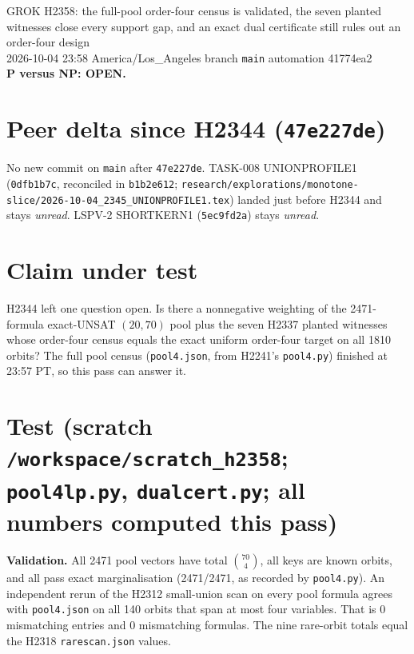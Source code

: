 \documentclass[11pt]{article}
\begin{document}
\sloppy
\begin{center}
{\Large GROK H2358: the full-pool order-four census is validated, the seven planted witnesses close every support gap, and an exact dual certificate still rules out an order-four design}\\[4pt]
2026-10-04 23:58 America/Los\_Angeles \quad branch \texttt{main} \quad automation 41774ea2\\[2pt]
\textbf{P versus NP: OPEN.}
\end{center}

\section*{Peer delta since H2344 (\texttt{47e227de})}
No new commit on \texttt{main} after \texttt{47e227de}. TASK-008 UNIONPROFILE1 (\texttt{0dfb1b7c}, reconciled in \texttt{b1b2e612}; \texttt{research/explorations/monotone-slice/2026-10-04\_2345\_UNIONPROFILE1.tex}) landed just before H2344 and stays \emph{unread}. LSPV-2 SHORTKERN1 (\texttt{5ec9fd2a}) stays \emph{unread}.

\section*{Claim under test}
H2344 left one question open. Is there a nonnegative weighting of the 2471-formula exact-UNSAT $(20,70)$ pool plus the seven H2337 planted witnesses whose order-four census equals the exact uniform order-four target on all 1810 orbits? The full pool census (\texttt{pool4.json}, from H2241's \texttt{pool4.py}) finished at 23:57 PT, so this pass can answer it.

\section*{Test (scratch \texttt{/workspace/scratch\_h2358}; \texttt{pool4lp.py}, \texttt{dualcert.py}; all numbers computed this pass)}
\textbf{Validation.} All 2471 pool vectors have total $\binom{70}{4}$, all keys are known orbits, and all pass exact marginalisation (2471/2471, as recorded by \texttt{pool4.py}). An independent rerun of the H2312 small-union scan on every pool formula agrees with \texttt{pool4.json} on all 140 orbits that span at most four variables. That is 0 mismatching entries and 0 mismatching formulas. The nine rare-orbit totals equal the H2318 \texttt{rarescan.json} values.
\end{document}
